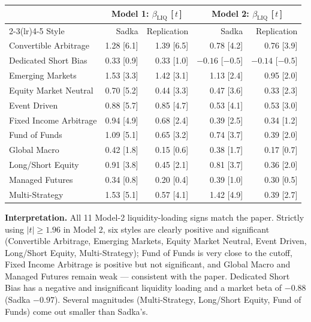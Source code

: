 \documentclass[10pt]{article}
\begin{document}
{\footnotesize
\begin{center}
\begin{tabular}{l rr rr}
\toprule
 & \multicolumn{2}{c}{Model 1: $\beta_{\text{LIQ}}$ [\,$t$\,]} & \multicolumn{2}{c}{Model 2: $\beta_{\text{LIQ}}$ [\,$t$\,]} \\
\cmidrule(lr){2-3}\cmidrule(lr){4-5}
Style & Sadka & Replication & Sadka & Replication \\
\midrule
Convertible Arbitrage   & 1.28 [6.1] & 1.39 [6.5] & 0.78 [4.2] & 0.76 [3.9] \\
Dedicated Short Bias     & 0.33 [0.9] & 0.33 [1.0] & $-0.16$ [$-0.5$] & $-0.14$ [$-0.5$] \\
Emerging Markets         & 1.53 [3.3] & 1.42 [3.1] & 1.13 [2.4] & 0.95 [2.0] \\
Equity Market Neutral    & 0.70 [5.2] & 0.44 [3.3] & 0.47 [3.6] & 0.33 [2.3] \\
Event Driven             & 0.88 [5.7] & 0.85 [4.7] & 0.53 [4.1] & 0.53 [3.0] \\
Fixed Income Arbitrage   & 0.94 [4.9] & 0.68 [2.4] & 0.39 [2.5] & 0.34 [1.2] \\
Fund of Funds            & 1.09 [5.1] & 0.65 [3.2] & 0.74 [3.7] & 0.39 [2.0] \\
Global Macro             & 0.42 [1.8] & 0.15 [0.6] & 0.38 [1.7] & 0.17 [0.7] \\
Long/Short Equity        & 0.91 [3.8] & 0.45 [2.1] & 0.81 [3.7] & 0.36 [2.0] \\
Managed Futures          & 0.34 [0.8] & 0.20 [0.4] & 0.39 [1.0] & 0.30 [0.5] \\
Multi-Strategy           & 1.53 [5.1] & 0.57 [4.1] & 1.42 [4.9] & 0.39 [2.7] \\
\bottomrule
\end{tabular}
\end{center}}

\textbf{Interpretation.} All 11 Model-2 liquidity-loading signs match the paper. Strictly using
$|t|\ge1.96$ in Model 2, six styles are clearly positive and significant (Convertible Arbitrage,
Emerging Markets, Equity Market Neutral, Event Driven, Long/Short Equity, Multi-Strategy); Fund of
Funds is very close to the cutoff, Fixed Income Arbitrage is positive but not significant, and
Global Macro and Managed Futures remain weak --- consistent with the paper. Dedicated Short Bias
has a negative and insignificant liquidity loading and a market beta of $-0.88$ (Sadka $-0.97$).
Several magnitudes (Multi-Strategy, Long/Short Equity, Fund of Funds) come out smaller than
Sadka's.
\end{document}
